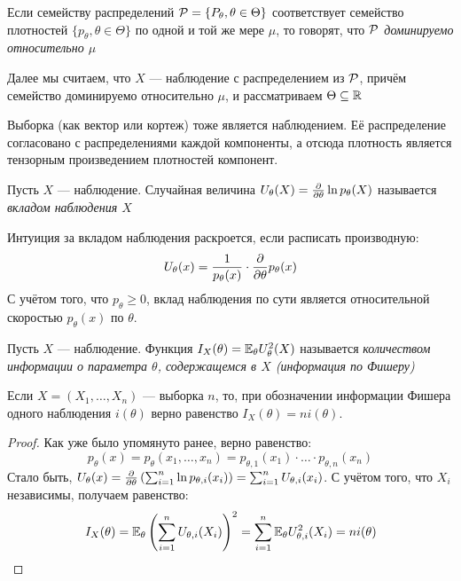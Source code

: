 \begin{definition}
	Если семейству распределений $\mathcal{P} = \{P_\theta, \theta \in \Theta\}$ соответствует семейство плотностей $\{p_\theta, \theta \in \Theta\}$ по одной и той же мере $\mu$, то говорят, что \textit{$\mathcal{P}$ доминируемо относительно $\mu$}
\end{definition}

\begin{note}
	Далее мы считаем, что $X$ --- наблюдение с распределением из $\mathcal{P}$, причём семейство доминируемо относительно $\mu$, и рассматриваем $\Theta \subseteq \mathbb{R}$
\end{note}

\begin{note}
	Выборка (как вектор или кортеж) тоже является наблюдением. Её распределение согласовано с распределениями каждой компоненты, а отсюда плотность является тензорным произведением плотностей компонент.
\end{note}

\begin{definition}
	Пусть $X$ --- наблюдение. Случайная величина $U_\theta(X) = \frac{\partial }{\partial \theta}\ln p_\theta(X)$ называется \textit{вкладом наблюдения $X$}
\end{definition}

\begin{note}
	Интуиция за вкладом наблюдения раскроется, если расписать производную:
	\[
	U_\theta(x) = \frac{1}{p_\theta(x)} \cdot  \frac{\partial }{\partial \theta} p_\theta(x)
	\]
	С учётом того, что $p_\theta \ge 0$, вклад наблюдения по сути является относительной скоростью $p_\theta(x)$ по $\theta$.
\end{note}

\begin{definition}
	Пусть $X$ --- наблюдение. Функция $I_X(\theta) = \mathbb{E}_\theta U_\theta^2(X)$ называется \textit{количеством информации о параметра $\theta$, содержащемся в $X$ (информация по Фишеру)}
\end{definition}

\begin{proposition}
	Если $X = (X_1, \ldots, X_n)$ --- выборка $n$, то, при обозначении информации Фишера одного наблюдения $i(\theta)$ верно равенство $I_X(\theta) = ni(\theta)$.
\end{proposition}

\begin{proof}
	Как уже было упомянуто ранее, верно равенство:
	\[
		p_\theta(x) = p_\theta(x_1, \ldots, x_n) = p_{\theta, 1}(x_1) \cdot \ldots \cdot p_{\theta, n}(x_n)
	\]
	Стало быть, $U_\theta(x) = \frac{\partial }{\partial \theta} \left(\sum_{i = 1}^n \ln p_{\theta, i}(x_i)\right) = \sum_{i = 1}^n U_{\theta, i}(x_i)$. С учётом того, что $X_i$ независимы, получаем равенство:
	\[
		I_X(\theta) = \mathbb{E}_\theta \left(\sum_{i = 1}^n U_{\theta, i}(X_i)\right)^2 = \sum_{i = 1}^n \mathbb{E}_\theta U_{\theta, i}^2(X_i) = ni(\theta)
	\]
\end{proof}

